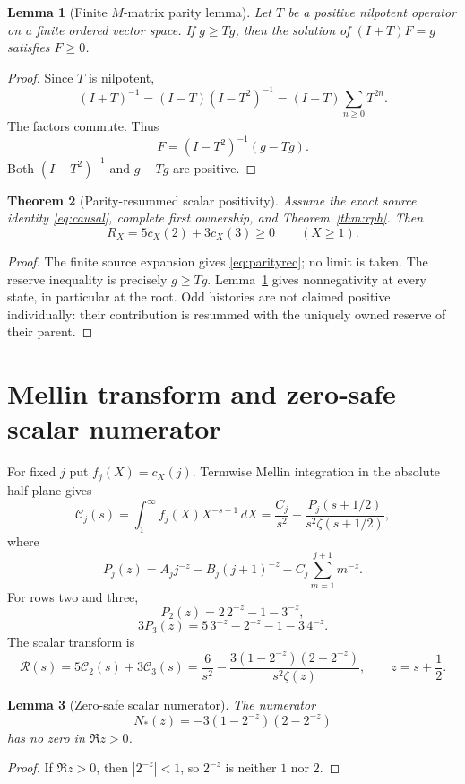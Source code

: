 \documentclass[11pt]{article}
\newtheorem{theorem}{Theorem}[section]
\newtheorem{lemma}[theorem]{Lemma}
\newcommand{\1}{\mathbf 1}
\begin{document}
\begin{lemma}[Finite $M$-matrix parity lemma]\label{lem:mmatrix}
Let $T$ be a positive nilpotent operator on a finite ordered vector space.  If $g\ge Tg$, then the solution of $(I+T)F=g$ satisfies $F\ge0$.
\end{lemma}
\begin{proof}
Since $T$ is nilpotent,
\[
 (I+T)^{-1}=(I-T)(I-T^2)^{-1}
 =(I-T)\sum_{n\ge0}T^{2n}.
\]
The factors commute.  Thus
\[
 F=(I-T^2)^{-1}(g-Tg).
\]
Both $(I-T^2)^{-1}$ and $g-Tg$ are positive.
\end{proof}

\begin{theorem}[Parity-resummed scalar positivity]\label{thm:scalarpos}
Assume the exact source identity \eqref{eq:causal}, complete first ownership, and Theorem~\ref{thm:rph}.  Then
\[
 \boxed{R_X=5c_X(2)+3c_X(3)\ge0\qquad(X\ge1).}
\]
\end{theorem}
\begin{proof}
The finite source expansion gives \eqref{eq:parityrec}; no limit is taken.  The reserve inequality is precisely $g\ge Tg$.  Lemma~\ref{lem:mmatrix} gives nonnegativity at every state, in particular at the root.  Odd histories are not claimed positive individually: their contribution is resummed with the uniquely owned reserve of their parent.
\end{proof}

\section{Mellin transform and zero-safe scalar numerator}

For fixed $j$ put $f_j(X)=c_X(j)$.  Termwise Mellin integration in the absolute half-plane gives
\[
 \mathcal C_j(s)=\int_1^\infty f_j(X)X^{-s-1}\,dX
 =\frac{C_j}{s^2}+\frac{P_j(s+1/2)}{s^2\zeta(s+1/2)},
\]
where
\[
 P_j(z)=A_jj^{-z}-B_j(j+1)^{-z}-C_j\sum_{m=1}^{j+1}m^{-z}.
\]
For rows two and three,
\[
 P_2(z)=2\,2^{-z}-1-3^{-z},
\]
\[
 3P_3(z)=5\,3^{-z}-2^{-z}-1-3\,4^{-z}.
\]
The scalar transform is
\begin{equation}\label{eq:scalarMellin}
 \mathcal R(s)=5\mathcal C_2(s)+3\mathcal C_3(s)
 =\frac6{s^2}-\frac{3(1-2^{-z})(2-2^{-z})}{s^2\zeta(z)},
 \qquad z=s+\frac12.
\end{equation}

\begin{lemma}[Zero-safe scalar numerator]\label{lem:zerosafe}
The numerator
\[
 N_*(z)=-3(1-2^{-z})(2-2^{-z})
\]
has no zero in $\Re z>0$.
\end{lemma}
\begin{proof}
If $\Re z>0$, then $|2^{-z}|<1$, so $2^{-z}$ is neither $1$ nor $2$.
\end{proof}
\end{document}
